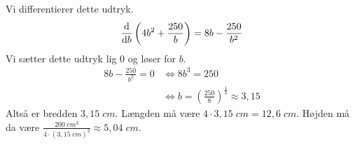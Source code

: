 \documentclass{article}
\begin{document}
Vi differentierer dette udtryk.
\begin{equation*}
\begin{split}
  \dv{b}\left(4b^2+\frac{250}{b}\right)=8b-\frac{250}{b^2}
\end{split}
\end{equation*}
Vi sætter dette udtryk lig 0 og løser for $b$.
\begin{equation*}
\begin{split}
  8b-\frac{250}{b^2}=0 &\iff 8b^3=250\\ 
  &\iff b=\left(\frac{250}{8}\right)^{\frac{1}{3}} \approx 3,15
\end{split}
\end{equation*}
Altså er bredden $3,15 \;\unit{cm} $.
Længden må være $4 \cdot 3,15 \;\unit{cm} =12,6 \;\unit{cm} $.
Højden må da være $\frac{200 \;\unit{cm^3} }{4 \cdot (3,15 \;\unit{cm} )^2} \approx 5,04 \;\unit{cm} $.
\end{document}
